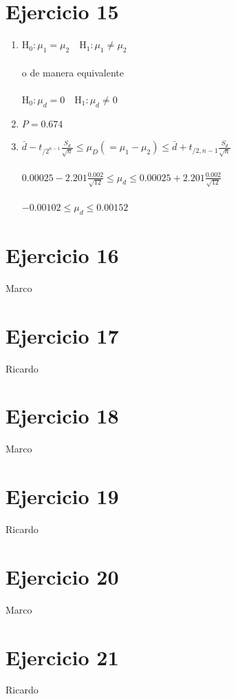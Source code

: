 \documentclass[12pt,a4paper,table]{article}
\begin{document}
\section*{Ejercicio 15}
\begin{enumerate}[label=(\alph*)]
    \item
    $\mathrm{H}_{0}: \mu_{1}=\mu_{2} \quad \mathrm{H}_{1}: \mu_{1} \neq \mu_{2}$\\\\
    o de manera equivalente\\\\
    $\mathrm{H}_{0}: \mu_{d}=0 \quad \mathrm{H}_{1}: \mu_{d} \neq 0$    
    \item
    		$P = 0.674$
    \item
    		$\bar{d}-t_{/ 2^{n-1}} \frac{S_{d}}{\sqrt{n}} \leq \mu_{D}\left(=\mu_{1}-\mu_{2}\right) \leq \bar{d}+t_{/ 2, n-1} \frac{S_{d}}{\sqrt{n}}$\\\\
$0.00025-2.201 \frac{0.002}{\sqrt{12}} \leq \mu_{d} \leq 0.00025+2.201 \frac{0.002}{\sqrt{12}}$\\\\
$-0.00102 \leq \mu_{d} \leq 0.00152$
\end{enumerate}

\section*{Ejercicio 16}
Marco

\section*{Ejercicio 17}
Ricardo

\section*{Ejercicio 18}
Marco

\section*{Ejercicio 19}
Ricardo

\section*{Ejercicio 20}
Marco

\section*{Ejercicio 21}
Ricardo
\end{document}
